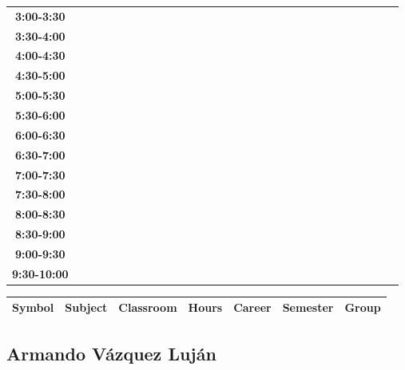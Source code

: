 \documentclass{article}
\begin{document}
\begin{table}[ht]
\begin{tabular}{|c|c|c|c|c|c|c|c|c|c|c|c|c|c|c|c|c|c|c|c|c|c|c|c|c|c|c|c|c|c|}
\textbf{3:00-3:30} &   &   &   &   &   &   &   \\
 \cline{1-8} 
\textbf{3:30-4:00} &   &   &   &   &   &   &   \\
 \cline{1-8} 
\textbf{4:00-4:30} &   &   &   &   &   &   &   \\
 \cline{1-8} 
\textbf{4:30-5:00} &   &   &   &   &   &   &   \\
 \cline{1-8} 
\textbf{5:00-5:30} &   &   &   &   &   &   &   \\
 \cline{1-8} 
\textbf{5:30-6:00} &   &   &   &   &   &   &   \\
 \cline{1-8} 
\textbf{6:00-6:30} &   &   &   &   &   &   &   \\
 \cline{1-8} 
\textbf{6:30-7:00} &   &   &   &   &   &   &   \\
 \cline{1-8} 
\textbf{7:00-7:30} &   &   &   &   &   &   &   \\
 \cline{1-8} 
\textbf{7:30-8:00} &   &   &   &   &   &   &   \\
 \cline{1-8} 
\textbf{8:00-8:30} &   &   &   &   &   &   &   \\
 \cline{1-8} 
\textbf{8:30-9:00} &   &   &   &   &   &   &   \\
 \cline{1-8} 
\textbf{9:00-9:30} &   &   &   &   &   &   &   \\
 \cline{1-8} 
\textbf{9:30-10:00} &   &   &   &   &   &   &   \\
 \cline{1-8} 
\end{tabular}\end{table}

        
        \begin{tabular}{|>{\centering\arraybackslash}m{2cm}|>{\centering\arraybackslash}m{4cm}|>{\centering\arraybackslash}m{2cm}|>{\centering\arraybackslash}m{2cm}|>{\centering\arraybackslash}m{2cm}|>{\centering\arraybackslash}m{2cm}|>{\centering\arraybackslash}m{2cm}|}
        \hline
        \textbf{Symbol} & \textbf{Subject} & \textbf{Classroom} & \textbf{Hours} & \textbf{Career} & \textbf{Semester} & \textbf{Group} \\
        \hline
        \end{tabular}
                    

        \newpage
        

        \subsection{Armando V\'azquez Luj\'an}
        \vspace*{.1cm}
        
\end{document}

